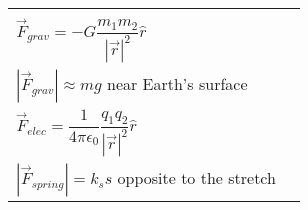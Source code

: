\begin{tabular}{ll}
	
	\hspace{1in} \\  %
	
	$\vec F_{grav} = -G \dfrac{m_{1} m_{2}}{\left| \vec r \right|^2} \hat{r}$ \\
	\vspace*{11pt}
	
	$\left| \vec F_{grav} \right| \approx m g$ near Earth's surface \\
	\vspace*{5 pt}
	
	$\vec F_{elec} = \dfrac{1}{4 \pi \epsilon_{0}} \dfrac{q_{1} q_{2}}{\left| \vec r \right|^2} \hat{r}$\\
	
	\vspace{5 pt}
	$\left| \vec F _{spring}\right| = k_{s} s$ opposite to the stretch \\
	
\end{tabular}

%
%


